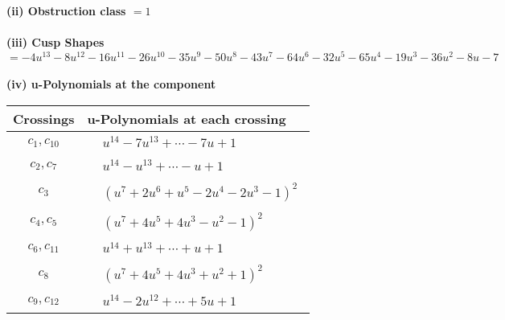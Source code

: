 \documentclass[1p]{elsarticle_modified}
\theoremstyle{definition}
\begin{document}
\flushleft \textbf{(ii) Obstruction class $= 1$}\\~\\
\flushleft \textbf{(iii) Cusp Shapes $= -4 u^{13}-8 u^{12}-16 u^{11}-26 u^{10}-35 u^9-50 u^8-43 u^7-64 u^6-32 u^5-65 u^4-19 u^3-36 u^2-8 u-7$}\\~\\
\newpage\renewcommand{\arraystretch}{1}
\flushleft \textbf{(iv) u-Polynomials at the component}\newline \\
\begin{tabular}{m{50pt}|m{274pt}}
Crossings & \hspace{64pt}u-Polynomials at each crossing \\
\hline $$\begin{aligned}c_{1},c_{10}\end{aligned}$$&$\begin{aligned}
&u^{14}-7 u^{13}+\cdots-7 u+1
\end{aligned}$\\
\hline $$\begin{aligned}c_{2},c_{7}\end{aligned}$$&$\begin{aligned}
&u^{14}- u^{13}+\cdots- u+1
\end{aligned}$\\
\hline $$\begin{aligned}c_{3}\end{aligned}$$&$\begin{aligned}
&(u^7+2 u^6+u^5-2 u^4-2 u^3-1)^2
\end{aligned}$\\
\hline $$\begin{aligned}c_{4},c_{5}\end{aligned}$$&$\begin{aligned}
&(u^7+4 u^5+4 u^3- u^2-1)^2
\end{aligned}$\\
\hline $$\begin{aligned}c_{6},c_{11}\end{aligned}$$&$\begin{aligned}
&u^{14}+u^{13}+\cdots+u+1
\end{aligned}$\\
\hline $$\begin{aligned}c_{8}\end{aligned}$$&$\begin{aligned}
&(u^7+4 u^5+4 u^3+u^2+1)^2
\end{aligned}$\\
\hline $$\begin{aligned}c_{9},c_{12}\end{aligned}$$&$\begin{aligned}
&u^{14}-2 u^{12}+\cdots+5 u+1
\end{aligned}$\\
\hline
\end{tabular}\\~\\
\end{document}
